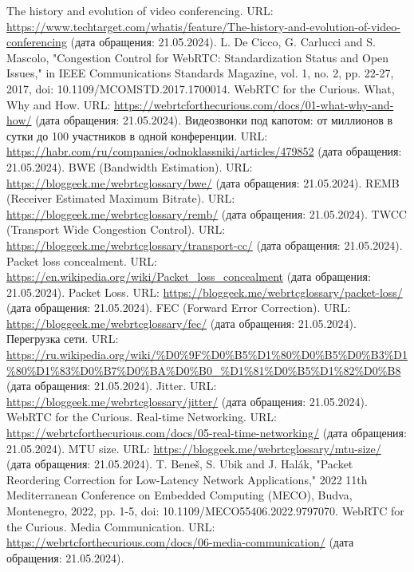\documentclass[a4paper,article,14pt]{extarticle}
\begin{document}
\begin{thebibliography}{1}
 The history and evolution of video conferencing. URL: \url{https://www.techtarget.com/whatis/feature/The-history-and-evolution-of-video-conferencing} (дата обращения: 21.05.2024).
 L. De Cicco, G. Carlucci and S. Mascolo, "Congestion Control for WebRTC: Standardization Status and Open Issues," in IEEE Communications Standards Magazine, vol. 1, no. 2, pp. 22-27, 2017, doi: 10.1109/MCOMSTD.2017.1700014.
 WebRTC for the Curious. What, Why and How. URL: \url{https://webrtcforthecurious.com/docs/01-what-why-and-how/} (дата обращения: 21.05.2024).
 Видеозвонки под капотом: от миллионов в сутки до 100 участников в одной конференции. URL: \url{https://habr.com/ru/companies/odnoklassniki/articles/479852} (дата обращения: 21.05.2024).
 BWE (Bandwidth Estimation). URL: \url{https://bloggeek.me/webrtcglossary/bwe/} (дата обращения: 21.05.2024).
 REMB (Receiver Estimated Maximum Bitrate). URL: \url{https://bloggeek.me/webrtcglossary/remb/} (дата обращения: 21.05.2024).
 TWCC (Transport Wide Congestion Control). URL: \url{https://bloggeek.me/webrtcglossary/transport-cc/} (дата обращения: 21.05.2024).
 Packet loss concealment. URL: \url{https://en.wikipedia.org/wiki/Packet_loss_concealment} (дата обращения: 21.05.2024).
 Packet Loss. URL: \url{https://bloggeek.me/webrtcglossary/packet-loss/} (дата обращения: 21.05.2024).
 FEC (Forward Error Correction). URL: \url{https://bloggeek.me/webrtcglossary/fec/} (дата обращения: 21.05.2024).
 Перегрузка сети. URL: \url{https://ru.wikipedia.org/wiki/%D0%9F%D0%B5%D1%80%D0%B5%D0%B3%D1%80%D1%83%D0%B7%D0%BA%D0%B0_%D1%81%D0%B5%D1%82%D0%B8} (дата обращения: 21.05.2024).
 Jitter. URL: \url{https://bloggeek.me/webrtcglossary/jitter/} (дата обращения: 21.05.2024).
 WebRTC for the Curious. Real-time Networking. URL: \url{https://webrtcforthecurious.com/docs/05-real-time-networking/} (дата обращения: 21.05.2024).
 MTU size. URL: \url{https://bloggeek.me/webrtcglossary/mtu-size/} (дата обращения: 21.05.2024).
 T. Beneš, S. Ubik and J. Halák, "Packet Reordering Correction for Low-Latency Network Applications," 2022 11th Mediterranean Conference on Embedded Computing (MECO), Budva, Montenegro, 2022, pp. 1-5, doi: 10.1109/MECO55406.2022.9797070.
 WebRTC for the Curious. Media Communication. URL: \url{https://webrtcforthecurious.com/docs/06-media-communication/} (дата обращения: 21.05.2024).

\end{thebibliography}
\end{document}
